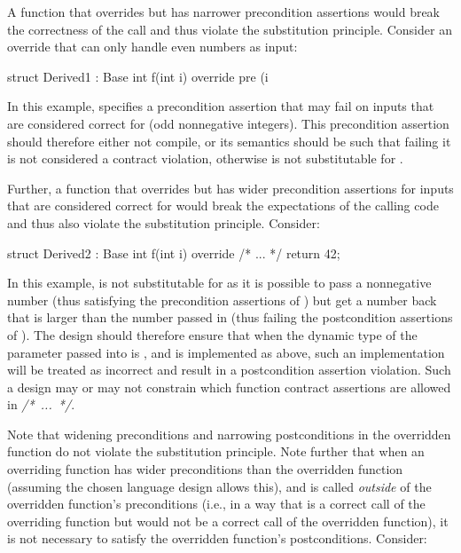 A function that overrides  but has narrower precondition assertions would break the correctness of the call and thus violate the substitution principle. Consider an override that can only handle even numbers as input:
\begin{codeblock}
struct Derived1 : Base {
  int f(int i) override
    pre (i %
}
\end{codeblock}
In this example,  specifies a precondition assertion that may fail on inputs that are considered correct for  (odd nonnegative integers). This precondition assertion should therefore either not compile, or its semantics should be such that failing it is not considered a contract violation, otherwise  is not substitutable for .

Further, a function that overrides  but has wider precondition assertions for inputs that are considered correct for  would break the expectations of the calling code and thus also violate the substitution principle. Consider:

\begin{codeblock}
struct Derived2 : Base {
  int f(int i) override /* ... */ {
    return 42;
  }
}
\end{codeblock}

In this example,  is not substitutable for  as it is possible to pass a nonnegative number (thus satisfying the precondition assertions of ) but get a number back that is larger than the number passed in (thus failing the postcondition assertions of ). The design should therefore ensure that when the dynamic type of the parameter passed into   is , and  is implemented as above, such an implementation will be treated as incorrect and result in a postcondition assertion violation. Such a design may or may not constrain which function contract assertions are allowed in \mbox{\emph{/* ... */}}.

Note that widening preconditions and narrowing postconditions in the overridden function do not violate the substitution principle. Note further that when an overriding function has wider preconditions than the overridden function (assuming the chosen language design allows this), and is called \emph{outside} of the overridden function's preconditions (i.e., in a way that is a correct call of the overriding function but would not be a correct call of the overridden function), it is not necessary to satisfy the overridden function's postconditions. Consider:

